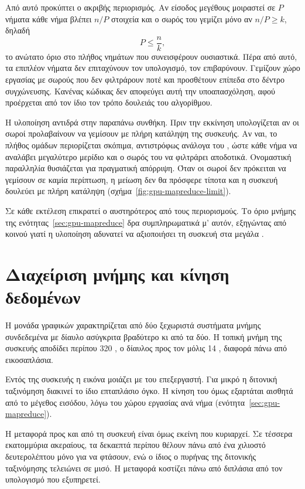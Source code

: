 Από αυτό προκύπτει ο ακριβής περιορισμός. Αν είσοδος μεγέθους  μοιραστεί
σε $P$ νήματα κάθε νήμα βλέπει $n/P$ στοιχεία και ο σωρός του γεμίζει μόνο αν
$n/P \geq k$, δηλαδή \[ P \leq \frac{n}{k}, \] το ανώτατο όριο στο πλήθος
νημάτων που συνεισφέρουν ουσιαστικά. Πέρα από αυτό, τα επιπλέον νήματα δεν
επιταχύνουν τον υπολογισμό, τον επιβαρύνουν. Γεμίζουν χώρο εργασίας με σωρούς
που δεν φιλτράρουν ποτέ και προσθέτουν επίπεδα στο δέντρο συγχώνευσης. Κανένας
κώδικας δεν αποφεύγει αυτή την υποαπασχόληση, αφού προέρχεται από τον ίδιο τον
τρόπο δουλειάς του αλγορίθμου.

Η υλοποίηση αντιδρά στην παραπάνω συνθήκη. Πριν την εκκίνηση υπολογίζεται αν οι
σωροί προλαβαίνουν να γεμίσουν με πλήρη κατάληψη της συσκευής. Αν ναι, το
πλήθος ομάδων περιορίζεται σκόπιμα, αντιστρόφως ανάλογα του , ώστε κάθε
νήμα να αναλάβει μεγαλύτερο μερίδιο και ο σωρός του να φιλτράρει αποδοτικά.
Ονομαστική παραλληλία θυσιάζεται για πραγματική απόρριψη. Όταν οι σωροί δεν
πρόκειται να γεμίσουν σε καμία περίπτωση, η μείωση δεν θα πρόσφερε τίποτα και η
συσκευή δουλεύει με πλήρη κατάληψη (σχήμα~\ref{fig:gpu-mapreduce-limit}).

Σε κάθε εκτέλεση επικρατεί ο αυστηρότερος από τους περιορισμούς. Το όριο μνήμης
της ενότητας~\ref{sec:gpu-mapreduce} δρα συμπληρωματικά μ' αυτόν, εξηγώντας από
κοινού γιατί η υλοποίηση αδυνατεί να αξιοποιήσει τη συσκευή στα μεγάλα .



\section{Διαχείριση μνήμης και κίνηση δεδομένων}
\label{sec:gpu-memory}

Η μονάδα γραφικών χαρακτηρίζεται από δύο ξεχωριστά συστήματα μνήμης συνδεδεμένα
με δίαυλο ασύγκριτα βραδύτερο κι από τα δύο. Η τοπική μνήμη της συσκευής
αποδίδει περίπου 320 , ο δίαυλος προς τον  μόλις 14
, διαφορά πάνω από εικοσαπλάσια.

Εντός της συσκευής η εικόνα μοιάζει με του επεξεργαστή. Για μικρό  η
διτονική ταξινόμηση διακινεί το ίδιο επταπλάσιο όγκο. Η κίνηση του
 όμως εξαρτάται αισθητά από το μέγεθος εισόδου, λόγω του χώρου
εργασίας ανά νήμα (ενότητα~\ref{sec:gpu-mapreduce}).

Η μεταφορά προς και από τη συσκευή είναι όμως εκείνη που κυριαρχεί. Σε τέσσερα
εκατομμύρια ακεραίους, τα δεκαεπτά περίπου  θέλουν πάνω από ένα χιλιοστό
δευτερολέπτου μόνο για να φτάσουν, ενώ ο ίδιος ο πυρήνας της διτονικής
ταξινόμησης τελειώνει σε μισό. Η μεταφορά κοστίζει πάνω από διπλάσια από τον
υπολογισμό που εξυπηρετεί.

